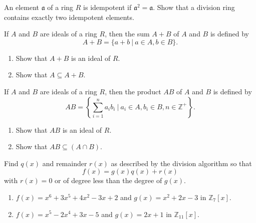 \begin{mdframed}
    \vspace{0.752cm}
    \begin{Exercise}
        An element $\mathfrak{a}$ of a ring $R$ is idempotent if $\mathfrak{a}^2 = \mathfrak{a}$. Show that a division ring 
        contains exactly two idempotent elements.
    \end{Exercise}

    \vspace{0.752cm}
    \begin{Exercise}
        If $A$ and $B$ are ideals of a ring $R$, then the sum $A + B$ of $A$ and $B$ is defined by 
        \[
            A + B = \{ a + b \> | \> a \in A, b \in B \}.
        \]
        \begin{enumerate}
            \item Show that $A + B$ is an ideal of $R$.
            \item Show that $A \subseteq A + B$.
        \end{enumerate}
    \end{Exercise}

    \vspace{0.752cm}
    \begin{Exercise}
        If $A$ and $B$ are ideals of a ring $R$, then the product $AB$ of $A$ and $B$ is defined by 
        \[
            AB = \left\{ \sum^n_{i=1} a_ib_i \> \bigg | \> a_i \in A, b_i \in B, n \in \mathbb{Z}^+ \right\}.
        \]
        \begin{enumerate}
            \item Show that $AB$ is an ideal of $R$.
            \item Show that $AB \subseteq (A \cap B)$.
        \end{enumerate}
    \end{Exercise}

    \vspace{0.752cm}
    \begin{Exercise}
        Find $q(x)$ and remainder $r(x)$ as described by the division algorithm so that 
        \[
            f(x) = g(x)q(x) + r(x)
        \]
        with $r(x) = 0$ or of degree less than the degree of $g(x)$.
        \begin{enumerate}
            \item $f(x) = x^6 + 3x^5 + 4x^2 - 3x + 2$ and $g(x) = x^2 + 2x - 3$ in $\mathbb{Z}_7[x]$.
            \item $f(x) = x^5 - 2x^4 + 3x - 5$ and $g(x) = 2x + 1$ in $\mathbb{Z}_{11}[x]$.
        \end{enumerate}
    \end{Exercise}
\end{mdframed}